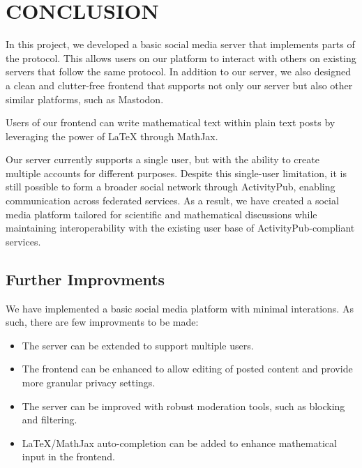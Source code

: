 \chapter{CONCLUSION}

In this project, we developed a basic social media server that implements parts of the \cite{ActivityPub} protocol. This allows users on our platform to interact with others on existing servers that follow the same protocol. In addition to our server, we also designed a clean and clutter-free frontend that supports not only our server but also other similar platforms, such as Mastodon\cite{mastodon}.

Users of our frontend can write mathematical text within plain text posts by leveraging the power of LaTeX through MathJax\cite{MathJax}.

Our server currently supports a single user, but with the ability to create multiple accounts for different purposes. Despite this single-user limitation, it is still possible to form a broader social network through ActivityPub, enabling communication across federated services. As a result, we have created a social media platform tailored for scientific and mathematical discussions while maintaining interoperability with the existing user base of ActivityPub-compliant services.

\section{Further Improvments}
We have implemented a basic social media platform with minimal interations. As such, there are few improvments to be made:
\begin{itemize}
  \item The server can be extended to support multiple users.
  \item The frontend can be enhanced to allow editing of posted content and provide more granular privacy settings.
  \item The server can be improved with robust moderation tools, such as blocking and filtering.
  \item LaTeX/MathJax auto-completion can be added to enhance mathematical input in the frontend.
\end{itemize}

